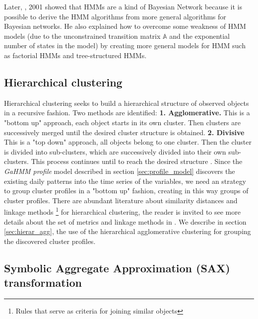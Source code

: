 Later, \citeauthor{ghahramani2001introduction}, 2001 \cite{ghahramani2001introduction} showed that HMMs are a kind of Bayesian Network because it is possible to derive the HMM algorithms from more general algorithms for Bayesian networks. He also explained how to overcome some weakness of HMM models (due to the unconstrained transition matrix $\mathbb{A}$ and the exponential number of states in the model) by creating more general models for HMM such as factorial HMMs and tree-structured HMMs. \\ 


\subsection{Hierarchical clustering}
\label{hierarchical}

Hierarchical clustering seeks to build a hierarchical structure of observed objects in a recursive fashion. Two methods are identified: \textbf{1. Agglomerative.}  This is a "bottom up" approach, each object starts in its own cluster. Then clusters are successively merged until the desired cluster structure is obtained. \textbf{2. Divisive} This is a "top down" approach, all objects belong to one cluster. Then the cluster is divided into sub-clusters, which are successively divided into their own sub-clusters. This process continues until to reach the desired structure \cite{maimon2007soft}. Since the \textit{GaHMM profile} model described in section \ref{sec:profile_model} discovers the existing daily patterns into the time series of the variables, we need an strategy to group cluster profiles in a "bottom up" fashion, creating in this way groups of cluster profiles. There are abundant literature about similarity distances and linkage methods  \footnote{Rules that serve as criteria for joining similar objects} for hierarchical clustering, the reader is invited to see more details about the set of metrics and linkage methods in \cite{saraccli2013comparison,mullner2011modern,maimon2007soft}. We describe in section \ref{sec:hierar_agg}, the use of the hierarchical agglomerative clustering for grouping the discovered cluster profiles.

 

\subsection{Symbolic Aggregate Approximation (SAX) transformation}
\label{section:SAX}

